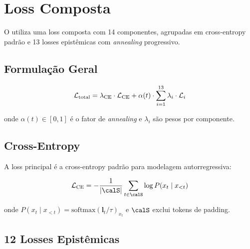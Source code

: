 
\section{Loss Composta}
\label{sec:loss}

O \aletheion{} utiliza uma loss composta com 14 componentes, agrupadas em
cross-entropy padr\~ao e 13 losses epist\^emicas com \textit{annealing}
progressivo.

\subsection{Formula\c{c}\~ao Geral}

\begin{equation}
    \mathcal{L}_{\text{total}} = \lambda_{\text{CE}} \cdot \mathcal{L}_{\text{CE}} + \alpha(t) \cdot \sum_{i=1}^{13} \lambda_i \cdot \mathcal{L}_i
    \label{eq:total_loss}
\end{equation}

onde $\alpha(t) \in [0, 1]$ \'e o fator de \textit{annealing} e $\lambda_i$
s\~ao pesos por componente.

\subsection{Cross-Entropy}

A loss principal \'e a cross-entropy padr\~ao para modelagem autorregressiva:

\begin{equation}
    \calL_{\text{CE}} = -\frac{1}{|\calS|} \sum_{t \in \calS} \log P(x_t \mid x_{<t})
\end{equation}

onde $P(x_t \mid x_{<t}) = \text{softmax}(\bm{l}_t / \tau)_{x_t}$ e
$\calS$ exclui tokens de padding.

\subsection{12 Losses Epist\^emicas}

